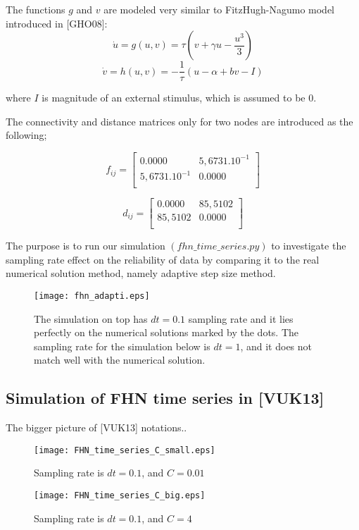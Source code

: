 \documentclass[12pt]{article}
\begin{document}
The functions $g$ and $v$ are modeled very similar to FitzHugh-Nagumo model introduced in [GHO08]:
\begin{equation}
 \dot{u}=g(u,v)=\tau(v+\gamma u - \frac{u^3}{3})
\end{equation}
\begin{equation}
 \dot{v}=h(u,v)=-\frac{1}{\tau}(u- \alpha +bv-I)
\end{equation}

where $I$ is magnitude of an external stimulus, which is assumed to be 0. 

The connectivity and distance matrices only for two nodes are introduced as the following;

\[
\textbf{$f_{ij}$}=
\left[ {\begin{array}{cc }
0.0000  &  5,6731.10^{-1} \\
5,6731.10^{-1} &  0.0000  \\

\end{array} } \right]
\]



\[
\textbf{$d_{ij}$}=
\left[ {\begin{array}{cc }
0.0000  &  85,5102 \\
85,5102 &  0.0000  \\

\end{array} } \right]
\]

The purpose is to run our simulation $(fhn\_time\_series.py)$ to investigate the sampling rate effect on the reliability of data by comparing it to the real numerical solution method, namely adaptive step size method.

\begin{figure}[h!]
	\centering
	\texttt{[image: fhn\_adapti.eps]}
		\caption{The simulation on top has $dt=0.1$ sampling rate and it lies perfectly on the numerical solutions marked by the dots. The sampling rate for the simulation below is $dt=1$, and it does not match well with the numerical solution.}
\end{figure}

\subsection{Simulation of FHN time series in [VUK13]}

The bigger picture of [VUK13] notations..

\begin{figure}[h!]
	\centering
	\texttt{[image: FHN\_time\_series\_C\_small.eps]}
		\caption{Sampling rate is $dt=0.1$, and $C=0.01$}
\end{figure}

\begin{figure}[h!]
	\centering
	\texttt{[image: FHN\_time\_series\_C\_big.eps]}
		\caption{Sampling rate is $dt=0.1$, and $C=4$}
\end{figure}
\end{document}
